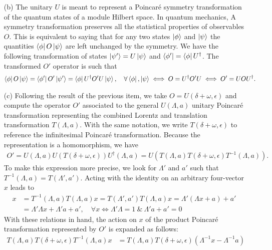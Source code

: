 \documentclass[10pt, a4paper]{article}
\begin{document}
\begin{enumerate}
  \item[(b)] The unitary $U$ is meant to represent a Poincaré symmetry transformation of the quantum states of a module Hilbert space. In quantum mechanics, A symmetry transformation preserves all the statistical properties of observables $O$. This is equivalent to saying that for any two states $\ket{\phi}$ and $\ket{\psi}$ the quantities $\bra{\phi}O\ket{\psi}$ are left unchanged by the symmetry. We have the following transformation of states $\ket{\psi'} = U\ket{\psi}$ and $\bra{\phi'} =\bra{\phi} U^\dagger$. The transformed $O'$ operator is such that
  \begin{align*}
    \bra{\phi}O\ket{\psi} = \bra{\phi'}O'\ket{\psi'} = \bra{\phi} U^\dagger O' U\ket{\psi},\quad \forall \bra{\phi}, \ket{\psi} \iff  O = U^\dagger O' U \iff O' = U O U^{\dagger}.
  \end{align*}
  \item[(c)] Following the result of the previous item, we take $O = U(\delta + \omega, \epsilon)$ and compute the operator $O'$ associated to the general $U(\Lambda, a)$ unitary Poincaré transformation representing the combined Lorentz and translation transformation $T(\Lambda, a)$. With the same notation, we write $T(\delta + \omega, \epsilon)$ to reference the infinitesimal Poincaré transformation.  Because the representation is a homomorphism, we have 
  \begin{align*}
    O' = U(\Lambda, a) U(T(\delta + \omega, \epsilon)) U^{\dagger}(\Lambda, a) = U(T(\Lambda, a)  T(\delta + \omega, \epsilon) T^{-1}(\Lambda, a)). 
  \end{align*}
  To make this expression more precise, we look for $\Lambda'$ and $a'$ such that $T^{-1}(\Lambda, a) = T(\Lambda', a')$. Acting with the identity on an arbitrary four-vector $x$ leads to 
  \begin{align*}
    x &= T^{-1}(\Lambda, a) T(\Lambda, a) x = T(\Lambda', a') T(\Lambda, a) x = \Lambda'(\Lambda x + a) + a' \\
    &= \Lambda'\Lambda x + \Lambda' a + a', \quad \forall x \iff \Lambda'\Lambda = 1\ \& \ \Lambda' a + a' = 0 
  \end{align*}
  With these relations in hand, the action on $x$ of the product Poincaré transformation represented by $O'$ is expanded as follows:
  \begin{align*}
    T(\Lambda, a)  T(\delta + \omega, \epsilon) T^{-1}(\Lambda, a)x &= T(\Lambda, a)  T(\delta + \omega, \epsilon)(\Lambda^{-1} x - \Lambda^{-1} a)\\

\end{align*}
\end{enumerate}
\end{document}
